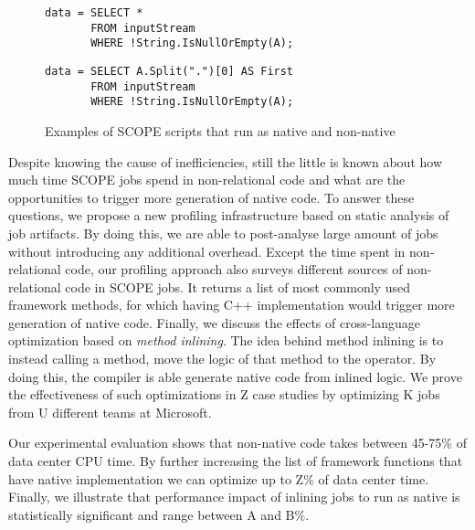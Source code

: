 \begin{figure}[ht]
 \begin{minipage}[b]{\linewidth}
  
   \begin{verbatim}
data = SELECT *
       FROM inputStream
       WHERE !String.IsNullOrEmpty(A);
\end{verbatim}

    \label{fig:native}
  \end{minipage}
  \begin{minipage}[b]{\linewidth}
   \begin{verbatim}
data = SELECT A.Split(".")[0] AS First
       FROM inputStream
       WHERE !String.IsNullOrEmpty(A);
    \end{verbatim}

    \label{fig:non-native}
  \end{minipage}


\caption{Examples of SCOPE scripts that run as native and non-native}
\label{fig:example}
\end{figure}

Despite knowing the cause of inefficiencies, still the little is known about how much time SCOPE jobs spend in non-relational code and what are the opportunities to trigger more generation of native code. 
To answer these questions, we propose a new profiling infrastructure based on static analysis of job artifacts.
By doing this, we are able to post-analyse large amount of jobs without introducing any additional overhead.
Except the time spent in non-relational code, our profiling approach also surveys different sources of non-relational code in SCOPE jobs.
It returns a list of most commonly used framework methods, for which having C++ implementation would trigger more generation of native code.
Finally, we discuss the effects of cross-language optimization based on \emph{method inlining}. 
The idea behind method inlining is to instead calling a method, move the logic of that method to the operator. By doing this, the compiler is able generate native code from inlined logic.
We prove the effectiveness of such optimizations in Z case studies by optimizing K jobs from U different teams at Microsoft. 

Our experimental evaluation shows that non-native code takes between 45-75\% of data center CPU time. By further increasing the list of framework functions that have native implementation we can optimize up to Z\% of data center time.
Finally, we illustrate that performance impact of inlining jobs to run as native is statistically significant and range between A and B\%. 

